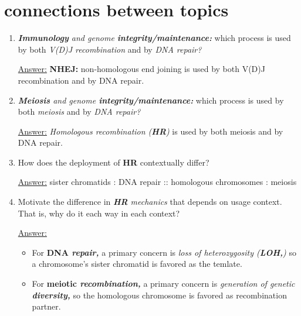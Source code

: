 \documentclass{article}
\newenvironment{QandA}{\begin{enumerate}[label=\bfseries Q\arabic*.]}
                       {\end{enumerate}}
\newenvironment{answered}{\par\normalfont\underline{Answer:}}{}
\begin{document}
\section{connections between topics}
\begin{QandA}
  \item{\textit{\textbf{Immunology} and genome \textbf{integrity/maintenance:}} which process is used by both \textit{V(D)J recombination} and by \textit{DNA repair?}}
    \begin{answered}
    \textbf{NHEJ:} non-homologous end joining is used by both V(D)J recombination and by DNA repair.
    \end{answered}
  \item{\textit{\textbf{Meiosis} and genome \textbf{integrity/maintenance:}} which process is used by both \textit{meiosis} and by \textit{DNA repair?}}
    \begin{answered}
    \textit{Homologous recombination (\textbf{HR})} is used by both meiosis and by DNA repair.
    \end{answered}
  \item{How does the deployment of \textbf{HR} contextually differ?}
    \begin{answered}
    sister chromatids : DNA repair :: homologous chromosomes : meiosis
    \end{answered}
  \item{Motivate the difference in \textit{\textbf{HR} mechanics} that depends on usage context. That is, why do it each way in each context?}
    \begin{answered}
    \begin{itemize}
      \item{For \textbf{DNA \textit{repair,}} a primary concern is \textit{loss of heterozygosity (\textbf{LOH,})} so a chromosome's sister chromatid is favored as the temlate.}
      \item{For \textbf{meiotic \textit{recombination,}} a primary concern is \textit{generation of genetic \textbf{diversity,}} so the homologous chromosome is favored as recombination partner.}
    \end{itemize}
    \end{answered}
\end{QandA}
\end{document}
